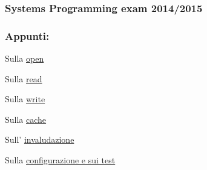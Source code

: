 \subsubsection*{Systems Programming exam 2014/2015}

\subsubsection*{Appunti\+:}


\begin{DoxyItemize}
\item Sulla \hyperlink{md_OPE}{open}
\item Sulla \hyperlink{md_READ}{read}
\item Sulla \hyperlink{md_WRITE}{write}
\item Sulla \hyperlink{md_Cache}{cache}
\item Sull' \hyperlink{md_Invalidazione}{invaludazione}
\item Sulla \hyperlink{md_Test}{configurazione e sui test} 
\end{DoxyItemize}